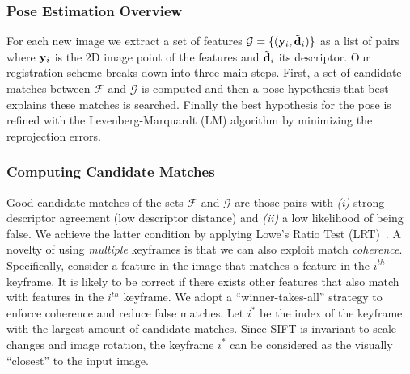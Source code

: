 \subsubsection{Pose Estimation Overview}
\label{sec:registration}
For each new image we extract a set of features  $\mathcal{G}=\{(\mathbf{y}_{i},\tilde{\mathbf{d}}_{i})\}$ as a list of pairs where $\mathbf{y}_{i}$ is the 2D image point of the features and $\tilde{\mathbf{d}}_{i}$ its descriptor. Our registration scheme breaks down into three main steps. First, a set of candidate matches between $\mathcal{F}$ and $\mathcal{G}$ is computed and then a pose hypothesis that best explains these matches is searched. Finally the best hypothesis for the pose is refined with the Levenberg-Marquardt (LM) algorithm by minimizing the reprojection errors.

\subsubsection{Computing Candidate Matches}
Good candidate matches of the sets $\mathcal{F}$ and $\mathcal{G}$ are those pairs with \textit{(i)} strong descriptor agreement (\ie low descriptor distance) and \textit{(ii)} a low likelihood of being false.
We achieve the latter condition by applying Lowe's Ratio Test (LRT)~\cite{Lowe:2004:DIF:993451.996342}.
A novelty of using \emph{multiple} keyframes is that we can also exploit match \emph{coherence}. Specifically, consider a feature in the image that matches a feature in the $i^{th}$ keyframe. It is likely to be correct if there exists other features that also match with features in the $i^{th}$ keyframe.
We adopt a ``winner-takes-all'' strategy to enforce coherence and reduce false matches.
Let $i^*$ be the index of the keyframe with the largest amount of candidate matches.
Since SIFT is invariant to scale changes and image rotation, the keyframe $i^*$ can be considered as the visually ``closest'' to the input image.
